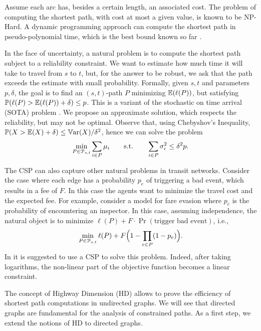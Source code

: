 Assume each arc has, besides a certain length, an associated cost. 
The problem of computing the shortest path, with cost at most a given value, is known to be NP-Hard.
A dynamic programming approach can compute the shortest path in pseudo-polynomial time, which is the best bound known so far .

In the face of uncertainty, a natural problem is to compute the shortest path subject to a reliability constraint.
We want to estimate how much time it will take to travel from $s$ to $t$, but, for the answer to be robust, we ask that the path exceeds the estimate with small probability.
Formally, given $s,t$ and parameters $p,\delta$, the goal is to find an $(s,t)$-path $P$ minimizing $\mathbb{E}(\ell(P))$, but satisfying $\mathbb{P}(\ell(P)>\mathbb{E}(\ell(P))+\delta)\leq p$.
This is a variant of the stochastic on time arrival (SOTA) problem .
We propose an approximate solution, which respects the reliability, but may not be optimal.
Observe that, using Chebyshov's Inequality, $\mathbb{P}(X>\mathbb{E}(X)+\delta)\leq \mathbb{V}\textnormal{ar}(X)/\delta^2$, hence we can solve
the problem 
\[
\min_{ P\in\mathcal{P}_{s,t}}\sum_{i\in P}\mu_i \qquad \text{s.t.}\qquad \sum_{i\in P}\sigma^2_i\leq \delta^2p.
\]


The CSP can also capture other natural problems in transit networks.
Consider the case where each edge has a probability $p_e$ of triggering a bad event, which results in a fee of $F$.
In this case the agents want to minimize the travel cost and the expected fee.
For example, \citet{fareevasion} consider a model for fare evasion where $p_e$ is the probability of encountering an inspector.
In this case, assuming independence, the natural object is to minimize $\ell(P)+F\cdot\Pr(\text{trigger bad event})$, i.e.,
\[
\min_{P\in\mathcal{P}_{s,t}} \ell(P)+F\Bigl(1-\prod_{e\in P}(1-p_e)\Bigr).
\]
In \citep{fareevasion} it is suggested to use a CSP to solve this problem.
Indeed, after taking logarithms, the non-linear part of the objective function becomes a linear constraint.

The concept of Highway Dimension (HD) \cite{highway2010,highway2013} allows to prove the efficiency of shortest path computations in undirected graphs.
We will see that directed graphs are fundamental for the analysis of constrained paths.
As a first step, we extend the notions of HD to directed graphs.